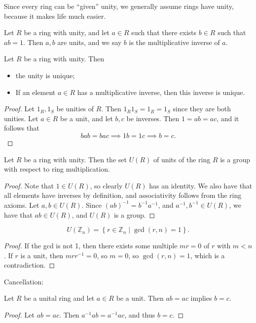 
Since every ring can be ``given'' unity, we generally assume rings have unity, because it makes life much easier.

\begin{definition}[Unit]\label{dfn:1.4}
	Let $R$ be a ring with unity, and let $a\in R$ such that there exists $b\in R$ such that $ab=1$. Then $a,b$ are units, and we say $b$ is the multiplicative inverse of $a$.
\end{definition}

\begin{proposition}\label{prp:1.2}
	Let $R$ be a ring with unity. Then
	\begin{itemize}
		\item the unity is unique;
		\item If an element $a\in R$ has a multiplicative inverse, then this inverse is unique.
	\end{itemize}
\end{proposition}
\begin{proof}
	Let $1_R,1_S$ be unities of $R$. Then $1_R1_S=1_R=1_S$ since they are both unities. Let $a\in R$ be a unit, and let $b,c$ be inverses. Then $1=ab=ac$, and it follows that
	\[
		bab=bac \implies 1b=1c \implies b=c
	.\]
\end{proof}
\begin{proposition}\label{prp:1.3}
	Let $R$ be a ring with unity. Then the set $U(R)$ of units of the ring $R$ is a group with respect to ring multiplication.
\end{proposition}
\begin{proof}
	Note that $1\in U(R)$, so clearly $U(R)$ has an identity. We also have that all elements have inverses by definition, and associativity follows from the ring axioms. Let $a,b\in U(R)$. Since $(ab)^{-1} =b^{-1} a^{-1} $, and $a^{-1} ,b^{-1} \in U(R)$, we have that $ab\in U(R)$, and $U(R)$ is a group.
\end{proof}
\begin{theorem}\label{thm:1.1}
	\[
		U(\mathbb{Z} _n)=\left\{ r\in\mathbb{Z} _n\mid \operatorname{gcd} (r,n)=1 \right\}
	.\]
\end{theorem}
\begin{proof}
	If the gcd is not 1, then there exists some multiple $mr=0$ of $r$ with $m<n$. If $r$ is a unit, then $mrr^{-1} =0$, so $m=0$, so $\operatorname{gcd} (r,n)=1$, which is a contradiction.
\end{proof}
Cancellation:
\begin{proposition}\label{prp:1.8}
	Let $R$ be a unital ring and let $a\in R$ be a unit. Then $ab=ac$ implies $b=c$.
\end{proposition}
\begin{proof}
	Let $ab=ac$. Then $a^{-1} ab=a^{-1} ac$, and thus $b=c$.
\end{proof}

